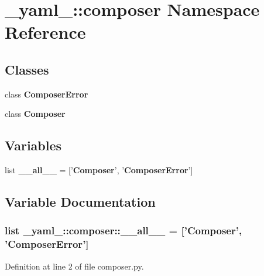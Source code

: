 \section{\_\-yaml\_\-::composer Namespace Reference}
\label{namespace__yaml___1_1composer}


\subsection*{Classes}
\begin{CompactItemize}
\item 
class {\bf ComposerError}
\item 
class {\bf Composer}
\end{CompactItemize}
\subsection*{Variables}
\begin{CompactItemize}
\item 
list {\bf \_\-\_\-all\_\-\_\-} = ['{\bf Composer}', '{\bf ComposerError}']
\end{CompactItemize}


\subsection{Variable Documentation}
\subsubsection{\setlength{\rightskip}{0pt plus 5cm}list {\bf \_\-yaml\_\-::composer::\_\-\_\-all\_\-\_\-} = ['{\bf Composer}', '{\bf ComposerError}']\hspace{0.3cm}{\tt  [static]}}\label{namespace__yaml___1_1composer_918a9af924e82d97d6621f9f5b461993}




Definition at line 2 of file composer.py.